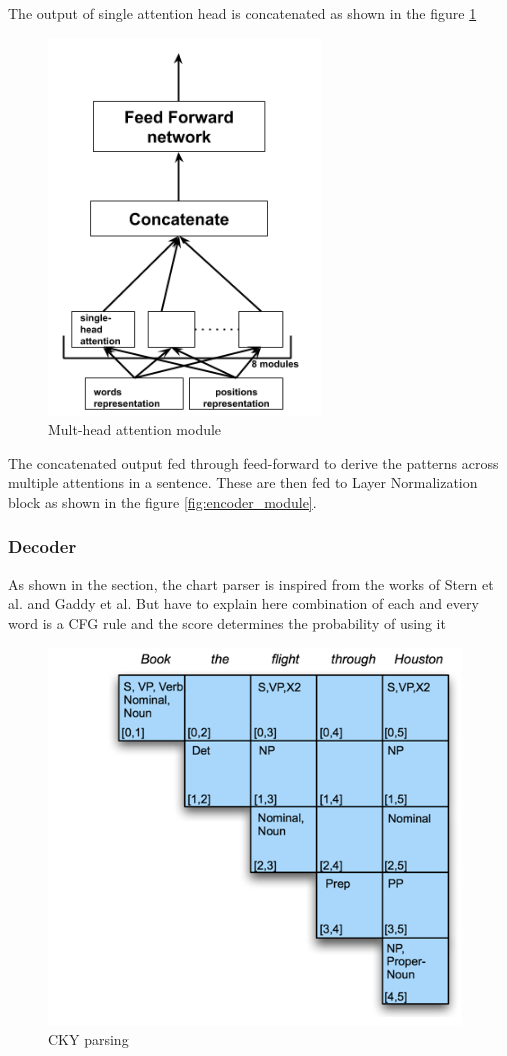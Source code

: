\documentclass[a4paper, 11pt]{article}
\begin{document}
The output of single attention head is concatenated as shown in the figure \ref{fig:multi_head_attention_module}
\begin{figure}[htpb]
    \centering
    \includegraphics[width=\textwidth,height=10cm,keepaspectratio=true]
    {multi-head-attention.png}
    \caption{
        Mult-head attention module
    }
    \label{fig:multi_head_attention_module}
\end{figure}

The concatenated output fed through feed-forward to derive the patterns across multiple attentions in a sentence. These are then fed to Layer Normalization block as shown in the figure \ref{fig:encoder_module}.

\subsubsection{Decoder}
As shown in the section, the chart parser is inspired from the works of Stern et al. and Gaddy et al. But have to explain here combination of each and every word is a CFG rule and the score determines the probability of using it

\begin{figure}[htpb]
    \centering
    \includegraphics[width=\textwidth,height=10cm,keepaspectratio=true]
    {cky-3.png}
    \caption{
        CKY parsing
    }
    \label{fig:CKY}
\end{figure}
\end{document}
